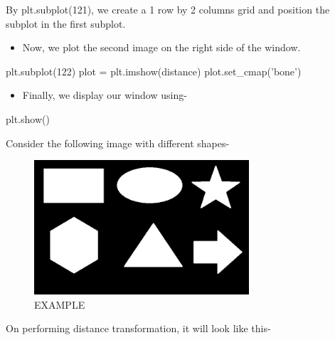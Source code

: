 \documentclass[]{article}
\newenvironment{Shaded}{}{}
\newcommand{\DecValTok}[1]{\textcolor[rgb]{0.25,0.63,0.44}{{#1}}}
\newcommand{\StringTok}[1]{\textcolor[rgb]{0.25,0.44,0.63}{{#1}}}
\newcommand{\OperatorTok}[1]{\textcolor[rgb]{0.40,0.40,0.40}{{#1}}}
\newcommand{\NormalTok}[1]{{#1}}
\providecommand{\tightlist}{%
  \setlength{\itemsep}{0pt}\setlength{\parskip}{0pt}}
\begin{document}
By plt.subplot(121), we create a 1 row by 2 columns grid and position
the subplot in the first subplot.

\begin{itemize}
\tightlist
\item
  Now, we plot the second image on the right side of the window.
\end{itemize}

\begin{Shaded}
\begin{Highlighting}[]
    \NormalTok{plt.subplot(}\DecValTok{122}\NormalTok{)}
    \NormalTok{plot }\OperatorTok{=} \NormalTok{plt.imshow(distance)}
    \NormalTok{plot.set_cmap(}\StringTok{'bone'}\NormalTok{)}
\end{Highlighting}
\end{Shaded}

\begin{itemize}
\tightlist
\item
  Finally, we display our window using-
\end{itemize}

\begin{Shaded}
\begin{Highlighting}[]
    \NormalTok{plt.show()}
\end{Highlighting}
\end{Shaded}

Consider the following image with different shapes-

\begin{figure}[htbp]
\centering
\includegraphics[width=8cm]{images/Distance Transform/example.jpg}
\caption{EXAMPLE}
\end{figure}
\pagebreak
On performing distance transformation, it will look like this-
\end{document}
